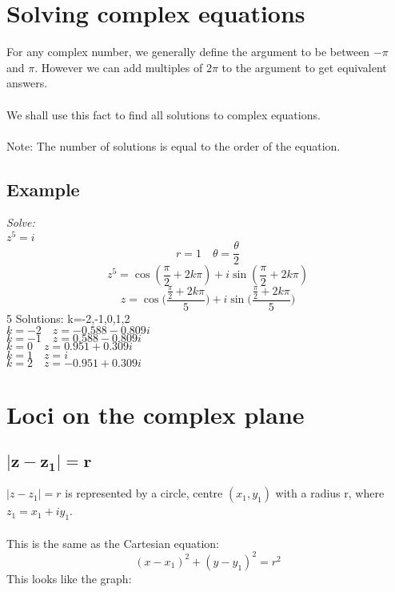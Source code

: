 \documentclass{article}[18pt]
\begin{document}
\section{Solving complex equations}
For any complex number, we generally define the argument to be between $-\pi$ and $\pi$. However we can add multiples of $2\pi$ to the argument to get equivalent answers.\\
\\
We shall use this fact to find all solutions to complex equations.\\
\\
Note: The number of solutions is equal to the order of the equation.
\subsection{Example}
\textit{Solve:}\\
$z^5=i$
$$r=1 \quad \theta=\frac{\theta}{2}$$
$$z^5=\cos(\frac{\pi}{2}+2k\pi)+i\sin(\frac{\pi}{2}+2k\pi)$$
$$z=\cos\Bigg(\frac{\frac{\pi}{2}+2k\pi}{5}
\Bigg)+i\sin\Bigg(\frac{\frac{\pi}{2}+2k\pi}{5}\Bigg)$$
5 Solutions: k=-2,-1,0,1,2\\
$k=-2 \quad z=-0.588-0.809i$\\
$k=-1 \quad z=0.588-0.809i$\\
$k=0 \quad z=0.951+0.309i$\\
$k=1 \quad z=i$\\
$k=2 \quad z=-0.951+0.309i$
\newpage
\section{Loci on the complex plane}
\subsection{$\mathbf{|z-z_1|=r}$}
$|z-z_1|=r$ is represented by a circle, centre $(x_1,y_1)$ with a radius r, where $z_1=x_1+iy_1$.\\
\\
This is the same as the Cartesian equation:
$$(x-x_1)^2+(y-y_1)^2=r^2$$
This looks like the graph:\\
\end{document}
